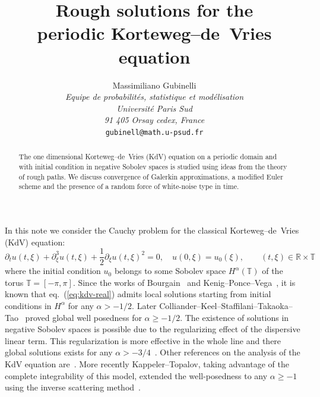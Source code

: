 \documentclass[a4paper,12pt,reqno]{article}
\newcommand{\RR}{\mathbb{R}}
\newcommand{\TT}{\mathbb{T}}
\begin{document}
\title{Rough solutions for the\\ periodic Korteweg--de~Vries equation}
\author{
  { Massimiliano Gubinelli}              \\
{\small\it Equipe de probabilit\'es, statistique et mod\'elisation }\\[-0.1cm]
  {\small\it  Universit\'e Paris Sud}          \\[-0.1cm]
{\small \it 91 405 Orsay cedex, France}\\[-0.1cm] 
 {\small  {\tt gubinell@math.u-psud.fr}}   
}
\maketitle


\begin{abstract}
The one dimensional Korteweg--de~Vries (KdV) equation on a periodic
domain and with initial condition in negative Sobolev spaces is
studied using ideas from the theory of rough paths. We discuss
convergence of Galerkin approximations, a modified Euler scheme and the presence of a random force of white-noise type in time.  
\end{abstract}

In this note we consider the Cauchy problem for the
 classical   Korteweg--de~Vries (KdV) equation:
\begin{equation}
  \label{eq:kdv-real}
\partial_t u(t,\xi) + \partial^3_\xi u(t,\xi) +
\frac12 \partial_\xi u(t,\xi)^2 = 0,\quad u(0,\xi) = u_0(\xi), \qquad
(t,\xi)\in\RR\times \TT  
\end{equation}
where  the initial condition $u_0$ belongs to some Sobolev space $H^\alpha(\TT)$
of the torus $\TT = [-\pi,\pi]$. Since the works of Bourgain~\cite{MR1215780,MR1423623} and
Kenig--Ponce--Vega~\cite{MR1329387,MR1230283,MR1086966}, it is known that eq.~(\ref{eq:kdv-real})  admits local
solutions starting from initial conditions in $H^\alpha$ for any
$\alpha >-1/2$.  Later Colliander--Keel--Staffilani--Takaoka--Tao~\cite{MR1969209} proved global well posedness for $\alpha \ge -1/2$. The existence of solutions in negative Sobolev spaces is possible due to the
regularizing effect of the dispersive linear term. This regularization
is more effective in the whole line and there global solutions exists for any $\alpha > -3/4$~\cite{MR1230283,MR1969209}. Other references on the analysis of the KdV equation are~\cite{MR1019307,MR759907}.
More recently  Kappeler--Topalov, taking advantage of the complete integrability of this model, extended the well-posedness to any $\alpha \ge -1$ using the inverse scattering method~\cite{MR2181576}.  
\end{document}
